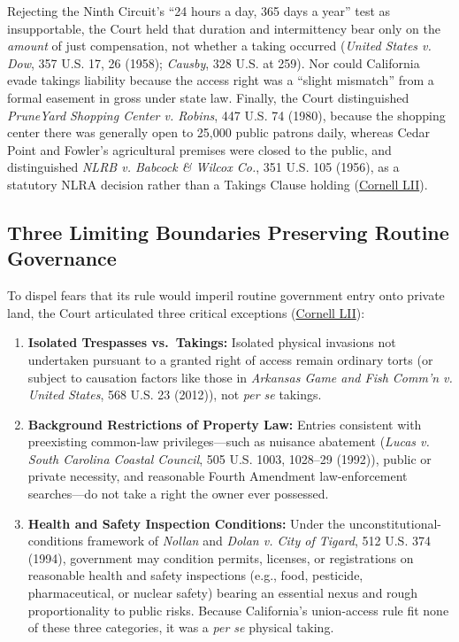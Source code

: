 \documentclass[12pt]{article}
\begin{document}
Rejecting the Ninth Circuit's ``24 hours a day, 365 days a year'' test as insupportable, the Court held that duration and intermittency bear only on the \emph{amount} of just compensation, not whether a taking occurred (\textit{United States v. Dow}, 357 U.S. 17, 26 (1958); \textit{Causby}, 328 U.S. at 259). Nor could California evade takings liability because the access right was a ``slight mismatch'' from a formal easement in gross under state law. Finally, the Court distinguished \textit{PruneYard Shopping Center v. Robins}, 447 U.S. 74 (1980), because the shopping center there was generally open to 25,000 public patrons daily, whereas Cedar Point and Fowler's agricultural premises were closed to the public, and distinguished \textit{NLRB v. Babcock \& Wilcox Co.}, 351 U.S. 105 (1956), as a statutory NLRA decision rather than a Takings Clause holding (\href{https://www.law.cornell.edu/supremecourt/text/20-107}{Cornell LII}).

\subsection{Three Limiting Boundaries Preserving Routine Governance}
To dispel fears that its rule would imperil routine government entry onto private land, the Court articulated three critical exceptions (\href{https://www.law.cornell.edu/supremecourt/text/20-107}{Cornell LII}):
\begin{enumerate}
    \item \textbf{Isolated Trespasses vs.\ Takings:} Isolated physical invasions not undertaken pursuant to a granted right of access remain ordinary torts (or subject to causation factors like those in \textit{Arkansas Game and Fish Comm'n v. United States}, 568 U.S. 23 (2012)), not \emph{per se} takings.
    \item \textbf{Background Restrictions of Property Law:} Entries consistent with preexisting common-law privileges---such as nuisance abatement (\textit{Lucas v. South Carolina Coastal Council}, 505 U.S. 1003, 1028--29 (1992)), public or private necessity, and reasonable Fourth Amendment law-enforcement searches---do not take a right the owner ever possessed.
    \item \textbf{Health and Safety Inspection Conditions:} Under the unconstitutional-conditions framework of \textit{Nollan} and \textit{Dolan v. City of Tigard}, 512 U.S. 374 (1994), government may condition permits, licenses, or registrations on reasonable health and safety inspections (e.g., food, pesticide, pharmaceutical, or nuclear safety) bearing an essential nexus and rough proportionality to public risks. Because California's union-access rule fit none of these three categories, it was a \emph{per se} physical taking.
\end{enumerate}
\end{document}
